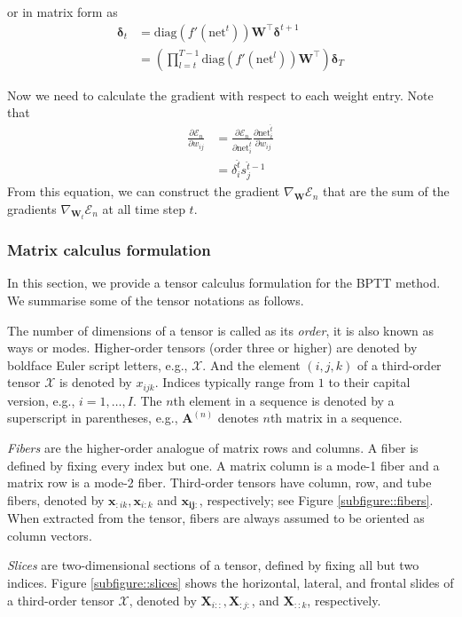 \documentclass[a4paper, 12pt]{report}
\begin{document}
or in matrix form as
\begin{align}
\bm{\delta}_t &= \mathrm{diag}(f'(\mathrm{net}^t)) \textbf{W}^\top \bm{\delta}^{t+1} \\
&= (\prod_{l=t}^{T-1} \mathrm{diag}(f'(\mathrm{net}^l)) \textbf{W}^\top) \bm{\delta}_{T}
\end{align}

Now we need to calculate the gradient with respect to each weight entry. Note that
\begin{align}
\frac{\partial {\mathcal{E}_n}}{\partial {w}_{ij}} &= \frac{\partial {\mathcal{E}_n}}{\partial {\mathrm{net}_{i}^{\hat{t}}}} \frac{\partial {\mathrm{net}_{i}^{\hat{t}}}}{\partial {w}_{ij}}  \tag{summation is over $t$} \\
&= \delta_{i}^{\hat{t}} s_{j}^{\hat{t}-1} \label{eq::dwij}
\end{align}
From this equation, we can construct the gradient $\nabla_{\textbf{W}} \mathcal{E}_n$ that are the sum of  the gradients $\nabla_{\textbf{W}_t} \mathcal{E}_n$ at all time step $t$. 

\subsubsection{Matrix calculus formulation}
In this section, we provide a tensor calculus formulation \cite{Kolda2009Tensor} for the BPTT method. 
We summarise some of the tensor notations as follows.

The number of dimensions of a tensor is called as its \emph{order}, it is also known as ways or modes.
Higher-order tensors (order three or higher) are denoted by boldface Euler script letters, e.g., $\mathcal{X}$. 
And the element $(i,j,k)$ of a third-order tensor $\mathcal{X}$ is denoted by $x_{ijk}$. 
Indices typically range from $1$ to their capital version, e.g., $i=1, \ldots, I$. 
The $n$th element in a sequence is denoted by a superscript in parentheses, e.g., $\mathbf{A}^{(n)}$ denotes $n$th matrix in a sequence.

\emph{Fibers} are the higher-order analogue of matrix rows and columns.
A fiber is defined by fixing every index but one. 
A  matrix column is a mode-1 fiber and a matrix row is a mode-2 fiber.
Third-order tensors have column, row, and tube fibers, denoted by $\bm{x}_{:ik}, \bm{x}_{i:k}$ and $\bm{x_{ij:}}$, respectively; see Figure \ref{subfigure::fibers}. 
When extracted from the tensor, fibers are always assumed to be oriented as column vectors. 

\emph{Slices} are two-dimensional sections of a tensor, defined by fixing all but two indices. 
Figure \ref{subfigure::slices} shows the horizontal, lateral, and frontal slides of a third-order tensor $\mathcal{X}$, denoted by $\textbf{X}_{i::}, \textbf{X}_{:j:}$, and $\textbf{X}_{::k}$, respectively.
\end{document}

